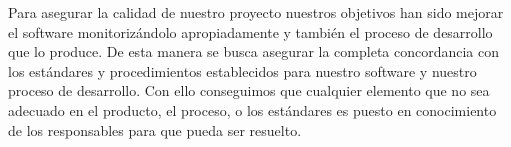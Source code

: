 Para asegurar la calidad de nuestro proyecto nuestros objetivos han sido mejorar el software monitorizándolo apropiadamente y también el proceso de desarrollo que lo produce. 
De esta manera se busca asegurar la completa concordancia con los estándares y procedimientos establecidos para nuestro software y nuestro proceso de desarrollo.
Con ello conseguimos que cualquier elemento que no sea adecuado en el producto, el proceso, o los estándares es puesto en conocimiento de los responsables para que pueda ser resuelto.

